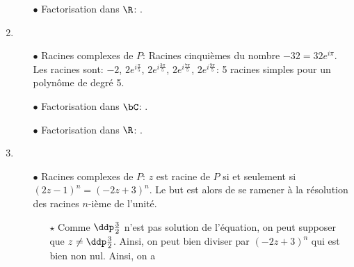 \documentclass[a4paper, 11pt,reqno]{article}
\begin{document}
\begin{correction}
\begin{enumerate}
\begin{itemize}
			      \item[$\bullet$] Factorisation dans $\R$: .
		      \end{itemize}
		\item
		      \begin{itemize}
			      \item[$\bullet$] Racines complexes de $P$: Racines cinqui\`{e}mes du nombre $-32=32e^{i\pi}$. Les racines sont: $-2$, $2e^{i\frac{\pi}{5}}$, $2e^{i\frac{3\pi}{5}}$, $2e^{i\frac{7\pi}{5}}$, $2e^{i\frac{9\pi}{5}}$: 5 racines simples pour un polyn\^{o}me de degr\'e 5.
			      \item[$\bullet$] Factorisation dans $\bC$: .
			      \item[$\bullet$] Factorisation dans $\R$: .
		      \end{itemize}
		\item
		      \begin{itemize}
			      \item[$\bullet$] Racines complexes de $P$: $z$ est racine de $P$ si et seulement si $(2z-1)^n=(-2z+3)^n$. Le but est alors de se ramener \`{a} la r\'esolution des racines $n$-i\`{e}me de l'unit\'e.
			            \begin{itemize}
				            \item[$\star$] Comme $\ddp\frac{3}{2}$ n'est pas solution de l'\'equation, on peut supposer que $z\not=\ddp\frac{3}{2}$. Ainsi, on peut bien diviser par $(-2z+3)^n$ qui est bien non nul. Ainsi, on a

\end{itemize}
\end{itemize}
\end{enumerate}
\end{correction}
\end{document}
